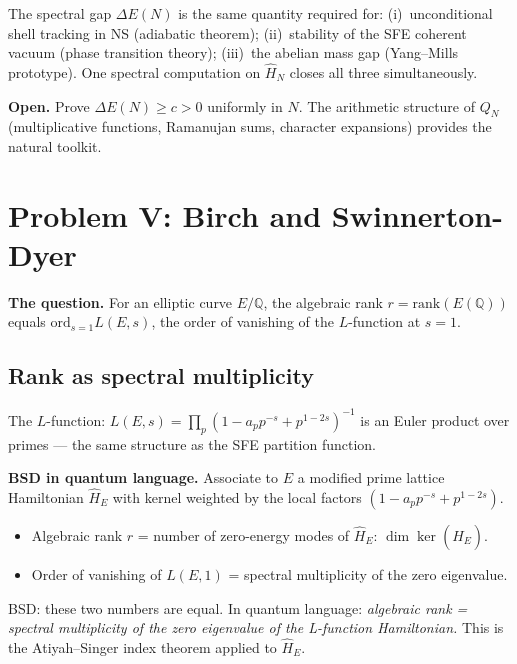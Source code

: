 \documentclass[12pt]{article}
\begin{document}
The spectral gap $\Delta E(N)$ is the same quantity required for:
(i)~unconditional shell tracking in NS (adiabatic theorem);
(ii)~stability of the SFE coherent vacuum (phase transition theory);
(iii)~the abelian mass gap (Yang--Mills prototype).
One spectral computation on $\hat{H}_N$ closes all three simultaneously.

\begin{tcolorbox}[openbox]
\textbf{Open.} Prove $\Delta E(N) \ge c > 0$ uniformly in $N$.
The arithmetic structure of $Q_N$ (multiplicative functions, Ramanujan
sums, character expansions) provides the natural toolkit.
\end{tcolorbox}

\section{Problem V: Birch and Swinnerton-Dyer}
\label{sec:bsd}

\textbf{The question.}
For an elliptic curve $E/\mathbb{Q}$, the algebraic rank
$r = \mathrm{rank}(E(\mathbb{Q}))$ equals
$\mathrm{ord}_{s=1} L(E,s)$, the order of vanishing of the
$L$-function at $s=1$.

\subsection{Rank as spectral multiplicity}

The $L$-function:
$L(E,s) = \prod_p (1 - a_p p^{-s} + p^{1-2s})^{-1}$
is an Euler product over primes --- the same structure as the
SFE partition function.

\begin{tcolorbox}[qbox]
\textbf{BSD in quantum language.}
Associate to $E$ a modified prime lattice Hamiltonian $\hat{H}_E$
with kernel weighted by the local factors $(1-a_pp^{-s}+p^{1-2s})$.
\begin{itemize}[itemsep=2pt]
  \item Algebraic rank $r$ = number of zero-energy modes of $\hat{H}_E$:
    $\dim\ker(\hat{H}_E)$.
  \item Order of vanishing of $L(E,1)$ = spectral multiplicity of the
    zero eigenvalue.
\end{itemize}
BSD: these two numbers are equal.
In quantum language: \emph{algebraic rank = spectral multiplicity of the
zero eigenvalue of the L-function Hamiltonian.}
This is the Atiyah--Singer index theorem applied to $\hat{H}_E$.
\end{tcolorbox}
\end{document}
